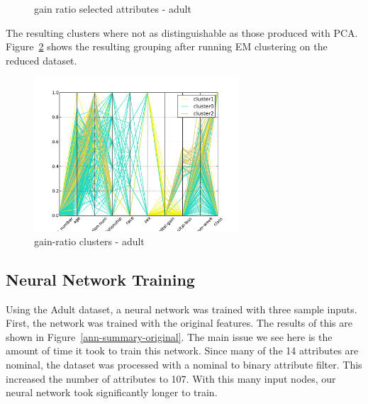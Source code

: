 \documentclass{sig-alternate}
\begin{document}
\begin{figure}[!htbp]
    \centering
    \theverbbox
    \caption{gain ratio selected attributes - adult\label{gain-adult}}
\end{figure}


The resulting clusters where not as distinguishable as those produced with PCA. Figure~\ref{parallel-gain-cluster} shows the resulting grouping after running EM clustering on the reduced dataset.

\begin{figure}[!htbp]
    \centering
    \includegraphics[width=3in]{part2/adult/parallel-gain-cluster.pdf}
    \caption{gain-ratio clusters - adult\label{parallel-gain-cluster}}
\end{figure} 



\subsection{Neural Network Training}

Using the Adult dataset, a neural network was trained with three sample inputs. First, the network was trained with the original features. The results of this are shown in Figure~\ref{ann-summary-original}. The main issue we see here is the amount of time it took to train this network. Since many of the 14 attributes are nominal, the dataset was processed with a nominal to binary attribute filter. This increased the number of attributes to 107. With this many input nodes, our neural network took significantly longer to train.
\end{document}
